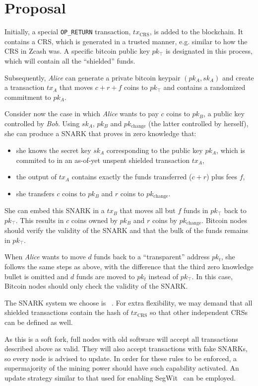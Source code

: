 \section{Proposal}
  Initially, a special \texttt{OP\_RETURN} transaction,
  $\mathit{tx}_{\mathrm{CRS}}$, is added to the blockchain. It contains a CRS,
  which is generated in a trusted manner, e.g.  similar to how the CRS in Zcash
  was. A specific bitcoin public key $pk_{\top}$ is designated in this process,
  which will contain all the ``shielded'' funds.

  Subsequently, \textit{Alice} can generate a private bitcoin keypair $(pk_A,
  sk_A)$ and create a transaction $\textit{tx}_A$ that moves $c + r + f$ coins
  to $pk_{\top}$ and contains a randomized commitment to $pk_A$.

  Consider now the case in which \textit{Alice} wants to pay $c$ coins to
  $pk_B$, a public key controlled by \textit{Bob}. Using $sk_A$, $pk_B$ and
  $pk_{\textrm{change}}$ (the latter controlled by herself), she can produce a
  SNARK that proves in zero knowledge that:
  \begin{itemize}
    \item she knows the secret key $sk_A$ corresponding to the public key
    $pk_A$, which is commited to in an as-of-yet unspent shielded transaction
    $\textit{tx}_A$,
    \item the output of $\textit{tx}_A$ contains exactly the funds transferred
    ($c + r$) plus fees $f$,
    \item she transfers $c$ coins to $pk_B$ and $r$ coins to
    $pk_{\mathrm{change}}$.
  \end{itemize}
  She can embed this SNARK in a $\textit{tx}_B$ that moves all but $f$ funds in
  $pk_{\top}$ back to $pk_{\top}$. This results in $c$ coins owned by $pk_B$ and
  $r$ coins by $pk_{\mathrm{change}}$. Bitcoin nodes should verify the validity
  of the SNARK and that the bulk of the funds remains in $pk_{\top}$.

  When \textit{Alice} wants to move $d$ funds back to a ``transparent''
  address $pk_t$, she follows the same steps as above, with the difference that
  the third zero knowledge bullet is omitted and $d$ funds are moved to $pk_t$
  instead of $pk_{\top}$. In this case, Bitcoin nodes should only check the
  validity of the SNARK.

  The SNARK system we choose is ~\cite{TODO:qap}. For extra
  flexibility, we may demand that all shielded transactions contain the hash of
  $\mathit{tx}_{\mathrm{CRS}}$ so that other independent CRSs can be defined as
  well.

  As this is a soft fork, full nodes with old software will accept all
  transactions described above as valid. They will also accept transactions with
  fake SNARKs, so every node is advised to update. In order for these rules to
  be enforced, a supermajority of the mining power should have such capability
  activated. An update strategy similar to that used for enabling
  SegWit~\cite{TODO:segwit} can be employed.

